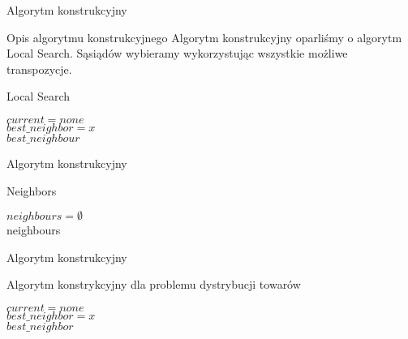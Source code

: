 \begin{frame}{Algorytm konstrukcyjny}
	
	\begin{block}{Opis algorytmu konstrukcyjnego}
		Algorytm konstrukcyjny oparliśmy o algorytm Local Search. 
		Sąsiądów wybieramy wykorzystując wszystkie możliwe transpozycje.
	\end{block}

	\begin{block}{Local Search}
		\begin{algorithm}[H]
			$current = none$ \\
			$best\_neighbor = x$ \\
			\Return $best\_neighbour$
		\end{algorithm}
	\end{block}

\end{frame}

\begin{frame}{Algorytm konstrukcyjny}

	\begin{block}{Neighbors}
		\begin{algorithm}[H]
			$ neighbours = \emptyset $ \\
			\Return neighbours
		\end{algorithm}
	\end{block}

\end{frame}

\begin{frame}{Algorytm konstrukcyjny}

	\begin{block}{Algorytm konstrykcyjny dla problemu dystrybucji towarów}
		\begin{algorithm}[H]
			$ current = none $ \\
			$ best\_neighbor = x $ \\
			\Return $best\_neighbor$
		\end{algorithm}
	\end{block}

\end{frame}